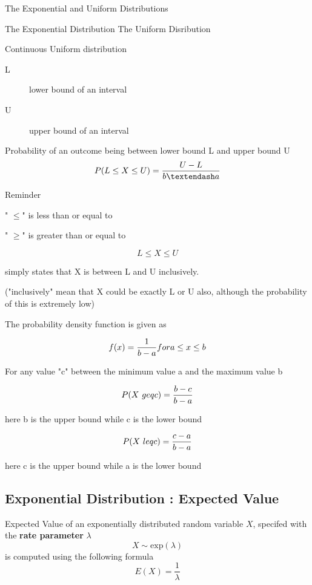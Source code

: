 \documentclass[12pt, a4paper]{report}
\author{ } \date{ }
\theoremstyle{definition}
\theoremstyle{remark}
\begin{document}
	
	The Exponential and Uniform Distributions
	
	The Exponential Distribution
	The Uniform Disribution
	
	
	Continuous Uniform distribution
	
	\begin{description}
		\item[L] lower bound of an interval
		\item[U] upper bound of an interval
	\end{description}
	Probability of an outcome being between lower bound L and upper bound U
	\[P( L \leq X \leq U)  =  { U - L \over  b – a }\]
	
	
	
	Reminder
	
	" $\leq$" is less than or equal to
	
	" $\geq$" is greater than or equal to
	
	
	\[L \leq X \leq U\]
	
	simply states that X is between L and U inclusively.
	
	("inclusively" mean that X could be exactly L or U also, although the probability of this is extremely low)
	
	
	
	The probability density function is given as
	
	\[f(x) = {1 \over b-a} for a \leq x \leq b\]
	
	For any value "c" between the minimum value a and the maximum value b
	
	\[P(X \ geq c) = {b-c \over b-a}\]
	
	here b is the upper bound while c is the lower bound
	
	
	\[P(X \ leq c) = {c-a \over b-a}\]
	
	here c is the upper bound while a is the lower bound
	
	

\subsection{Exponential Distribution : Expected Value}
Expected Value of an exponentially distributed random variable $X$, specifed with the \textbf{rate parameter} $\lambda$
\[ X \sim \mbox{exp}(\lambda)  \]
is computed using the following formula
\[ E(X) = \frac{1}{\lambda} \]
\end{document}
